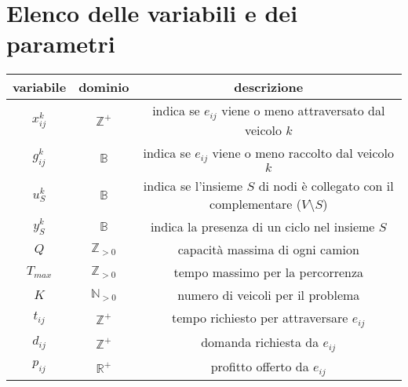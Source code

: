 \section{Elenco delle variabili e dei parametri}
\begin{table}[h]
	\begin{tabular}{|c|c|c|}
		\hline
			\textbf{variabile} & \textbf{dominio} & \textbf{descrizione}\\
		\hline
			$x_{ij}^{k}$ & $\mathbb{Z}^+$ & indica se $e_{ij}$ viene o meno attraversato dal veicolo $k$ \\
		\hline
			$g_{ij}^{k}$ & $\mathbb{B}$ & indica se $e_{ij}$ viene o meno raccolto dal veicolo $k$\\
		\hline
			$u_S^{k}$ & $\mathbb{B}$ & indica se l'insieme $S$ di nodi è collegato con il complementare ($V\setminus{S}$)\\
		\hline
			$y_S^{k}$ & $\mathbb{B}$ & indica la presenza di un ciclo nel insieme $S$\\
		\hline
			$Q$ & $\mathbb{Z}_{>0}$ & capacità massima di ogni camion \\
		\hline
			$T_{max}$ & $\mathbb{Z}_{>0}$& tempo massimo per la percorrenza \\
		\hline
			$K$ & $ \mathbb{N}_{>0}$ & numero di veicoli per il problema\\
		\hline
			$t_{ij}$ & $\mathbb{Z}^+$ & tempo richiesto per attraversare $e_{ij}$\\
		\hline
			$d_{ij}$ & $\mathbb{Z}^+$ & domanda richiesta da $e_{ij}$\\
		\hline
			$p_{ij}$ & $\mathbb{R}^+$ & profitto offerto da $e_{ij}$\\
		\hline
	\end{tabular}
\end{table}
